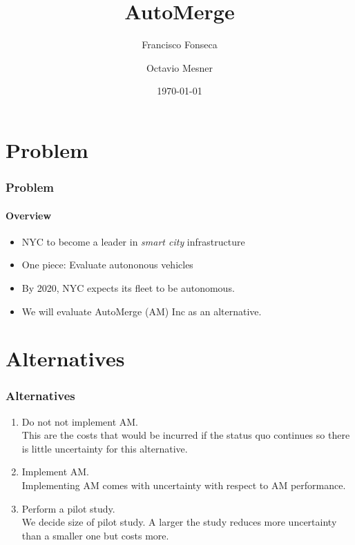 \documentclass{beamer}
\title{AutoMerge}
\subtitle{}
\date{\today}
\author[Fonseca Mesner]{Francisco Fonseca \and Octavio Mesner}
\institute{Carnegie Mellon University}
\begin{document}
\maketitle


\section{Problem}

\begin{frame}
  \frametitle{Problem}
  \framesubtitle{Overview}
  \begin{itemize}
  \item NYC to become a leader in \emph{smart city} infrastructure
  \item One piece: Evaluate autononous vehicles
  \item By 2020, NYC expects its fleet to be autonomous.
  \item We will evaluate AutoMerge (AM) Inc as an alternative.
  \end{itemize}
\end{frame}

\section{Alternatives}
\begin{frame}
  \frametitle{Alternatives}
  \begin{enumerate}
  \item Do not not implement AM.\\
    This are the costs that would be incurred if the status quo
    continues so there is little uncertainty for this alternative.
  \item Implement AM.\\
    Implementing AM comes with uncertainty with respect to AM
    performance.
  \item Perform a pilot study.\\
    We decide size of pilot study.  A larger the study reduces more
    uncertainty than a smaller one but costs more.
  \end{enumerate}
\end{frame}
\end{document}
